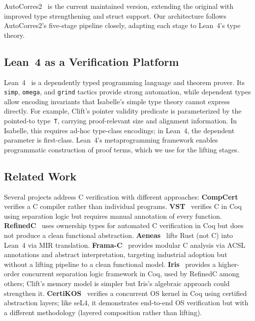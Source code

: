\documentclass[sigconf,nonacm,screen]{acmart}
\begin{document}
AutoCorres2~\cite{autocorres2} is the current maintained version,
extending the original with improved type strengthening and struct
support. Our architecture follows AutoCorres2's five-stage pipeline
closely, adapting each stage to Lean~4's type theory.

\subsection{Lean~4 as a Verification Platform}

Lean~4~\cite{demoura2021lean4} is a dependently typed programming
language and theorem prover. Its \texttt{simp}, \texttt{omega}, and
\texttt{grind} tactics provide strong automation, while dependent
types allow encoding invariants that Isabelle's simple type theory
cannot express directly. For example, Clift's pointer validity predicate is parameterized
by the pointed-to type~\texttt{T}, carrying proof-relevant size
and alignment information. In Isabelle, this requires ad-hoc
type-class encodings; in Lean~4, the dependent parameter is
first-class.
Lean~4's metaprogramming framework enables
programmatic construction of proof terms, which we use for the
lifting stages.

\subsection{Related Work}

Several projects address C verification with different approaches:
\textbf{CompCert}~\cite{leroy2009compcert} verifies a C compiler
rather than individual programs. \textbf{VST}~\cite{appel2011vst}
verifies C in Coq using separation logic but requires manual
annotation of every function. \textbf{RefinedC}~\cite{sammler2021refinedc}
uses ownership types for automated C verification in Coq but does not
produce a clean functional abstraction. \textbf{Aeneas}~\cite{ho2022aeneas}
lifts Rust (not C) into Lean~4 via MIR translation.
\textbf{Frama-C}~\cite{kirchner2015framac} provides modular C
analysis via ACSL annotations and abstract interpretation, targeting
industrial adoption but without a lifting pipeline to a clean
functional model. \textbf{Iris}~\cite{jung2018iris} provides a
higher-order concurrent separation logic framework in Coq, used by
RefinedC among others; Clift's memory model is simpler but Iris's
algebraic approach could strengthen it.
\textbf{CertiKOS}~\cite{gu2016certikos} verifies a concurrent OS
kernel in Coq using certified abstraction layers; like seL4, it
demonstrates end-to-end OS verification but with a different
methodology (layered composition rather than lifting).
\end{document}
